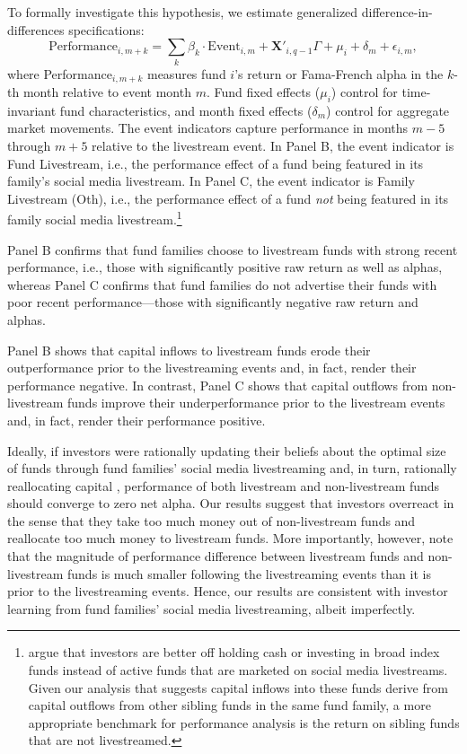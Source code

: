 \documentclass[12pt]{article}
\begin{document}
To formally investigate this hypothesis, we estimate generalized difference-in-differences specifications:
\begin{equation}
    \label{eq:fund_performance_appendix}
    \text{Performance}_{i,m+k} = \sum_k \beta_k \cdot \text{Event}_{i,m} + \mathbf{X}'_{i,q-1} \Gamma + \mu_i + \delta_m + \epsilon_{i,m},
\end{equation}
where Performance$_{i,m+k}$ measures fund $i$'s return or Fama-French alpha in the $k$-th month relative to event month $m$. Fund fixed effects ($\mu_i$) control for time-invariant fund characteristics, and month fixed effects ($\delta_m$) control for aggregate market movements. The event indicators capture performance in months $m-5$ through $m+5$ relative to the livestream event. In Panel B, the event indicator is Fund Livestream, i.e., the performance effect of a fund being featured in its family's social media livestream. In Panel C, the event indicator is Family Livestream (Oth), i.e., the performance effect of a fund \textit{not} being featured in its family social media livestream.\footnote{\citet{dehaan2025social} argue that investors are better off holding cash or investing in broad index funds instead of active funds that are marketed on social media livestreams. Given our analysis that suggests capital inflows into these funds derive from capital outflows from other sibling funds in the same fund family, a more appropriate benchmark for performance analysis is the return on sibling funds that are not livestreamed.}

Panel B confirms that fund families choose to livestream funds with strong recent performance, i.e., those with significantly positive raw return as well as alphas, whereas Panel C confirms that fund families do not advertise their funds with poor recent performance---those with significantly negative raw return and alphas.

Panel B shows that capital inflows to livestream funds erode their outperformance prior to the livestreaming events and, in fact, render their performance negative. In contrast, Panel C shows that capital outflows from non-livestream funds improve their underperformance prior to the livestream events and, in fact, render their performance positive.

Ideally, if investors were rationally updating their beliefs about the optimal size of funds through fund families' social media livestreaming and, in turn, rationally reallocating capital \citep{berk2004mutual}, performance of both livestream and non-livestream funds should converge to zero net alpha. Our results suggest that investors overreact in the sense that they take too much money out of non-livestream funds and reallocate too much money to livestream funds. More importantly, however, note that the magnitude of performance difference between livestream funds and non-livestream funds is much smaller following the livestreaming events than it is prior to the livestreaming events. Hence, our results are consistent with investor learning from fund families' social media livestreaming, albeit imperfectly.
\end{document}
